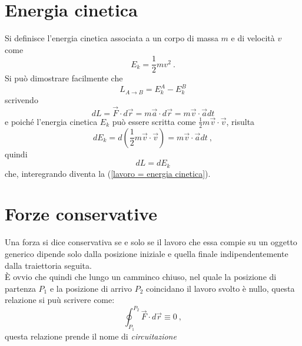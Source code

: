 \documentclass[12pt, oneside]{book}
\begin{document}
\section{Energia cinetica}
Si definisce l'energia cinetica associata a un corpo di massa $m$ e di velocità $v$ come
\[E_k=\dfrac{1}{2}mv^2~.\]
Si può dimostrare facilmente che
\begin{equation}
\label{lavoro = energia cinetica}
L_{A\to B}=E_k^A-E_k^B
\end{equation}
scrivendo
\[dL=\vec{F}\cdot d\vec{r}=m\vec{a}\cdot d\vec{r}=m\vec v \cdot\vec a dt\]
e poiché l'energia cinetica $E_k$ può essere scritta come $\frac{1}{2}m\vec v\cdot \vec v$, risulta
\[dE_k=d\left(\dfrac{1}{2}m\vec v \cdot\vec v\right) =m\vec v \cdot \vec a dt~,\]
quindi
\[dL=dE_k\]
che, interegrando diventa la (\ref{lavoro = energia cinetica}).

\section{Forze conservative}
Una forza si dice conservativa se e solo se il lavoro che essa compie su un oggetto generico dipende solo dalla posizione iniziale e quella finale indipendentemente dalla traiettoria seguita.\\
\`{E} ovvio che quindi che lungo un camminco chiuso, nel quale la posizione di partenza $P_1$ e la posizione di arrivo $P_2$ coincidano il lavoro svolto è nullo, questa relazione si puù scrivere come:
\[\oint_{P_1}^{P_2} \vec F \cdot d\vec r \equiv 0 ~,\]
questa relazione prende il nome di \emph{circuitazione}
\end{document}
